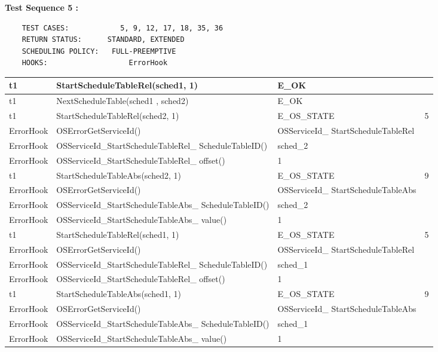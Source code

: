 \documentclass[10pt]{article}
\newlength{\Li}\settowidth{\Li}{Running}
\newlength{\Lii}\setlength{\Lii}{7cm}
\newlength{\Liiii}\setlength{\Liiii}{0.9cm}
\newlength{\Liii}\setlength{\Liii}{\textwidth} \addtolength{\Liii}{-\Li} \addtolength{\Liii}{-\Lii} \addtolength{\Liii}{-\Liiii}
\begin{document}
	\textbf{Test Sequence 5 :}
	\begin{lstlisting}
	TEST CASES:		       5, 9, 12, 17, 18, 35, 36
	RETURN STATUS:	  	STANDARD, EXTENDED
	SCHEDULING POLICY:   FULL-PREEMPTIVE
	HOOKS:			         ErrorHook
	\end{lstlisting}
	
	
	\begin{supertabular}{|p{\Li}|p{\Lii}|p{\Liii}|p{\Liiii}|} \hline 
	t1		& StartScheduleTableRel(sched1, 1)										& E\_OK												& \\ \hline
	t1		& NextScheduleTable(sched1 , sched2)										& E\_OK												& \\ \hline
	t1		& StartScheduleTableRel(sched2, 1)										& E\_OS\_STATE										& 5 \\ \hline
	ErrorHook	& OSErrorGetServiceId()													& OSServiceId\_ StartScheduleTableRel						& \\ \hline
	ErrorHook	& OSServiceId\_StartScheduleTableRel\_ ScheduleTableID()						& sched\_2											& \\ \hline
	ErrorHook	& OSServiceId\_StartScheduleTableRel\_ offset()								& 1													& \\ \hline
	
	t1		& StartScheduleTableAbs(sched2, 1)										& E\_OS\_STATE										& 9 \\ \hline
	ErrorHook	& OSErrorGetServiceId()													& OSServiceId\_ StartScheduleTableAbs						& \\ \hline
	ErrorHook	& OSServiceId\_StartScheduleTableAbs\_ ScheduleTableID()						& sched\_2											& \\ \hline
	ErrorHook	& OSServiceId\_StartScheduleTableAbs\_ value()								& 1													& \\ \hline
	
	t1		& StartScheduleTableRel(sched1, 1)										& E\_OS\_STATE										& 5 \\ \hline
	ErrorHook	& OSErrorGetServiceId()													& OSServiceId\_ StartScheduleTableRel						& \\ \hline
	ErrorHook	& OSServiceId\_StartScheduleTableRel\_ ScheduleTableID()						& sched\_1											& \\ \hline
	ErrorHook	& OSServiceId\_StartScheduleTableRel\_ offset()								& 1													& \\ \hline
	
	t1		& StartScheduleTableAbs(sched1, 1)										& E\_OS\_STATE										& 9 \\ \hline
	ErrorHook	& OSErrorGetServiceId()													& OSServiceId\_ StartScheduleTableAbs						& \\ \hline
	ErrorHook	& OSServiceId\_StartScheduleTableAbs\_ ScheduleTableID()						& sched\_1											& \\ \hline
	ErrorHook	& OSServiceId\_StartScheduleTableAbs\_ value()								& 1													& \\ \hline


\end{supertabular}
\end{document}
